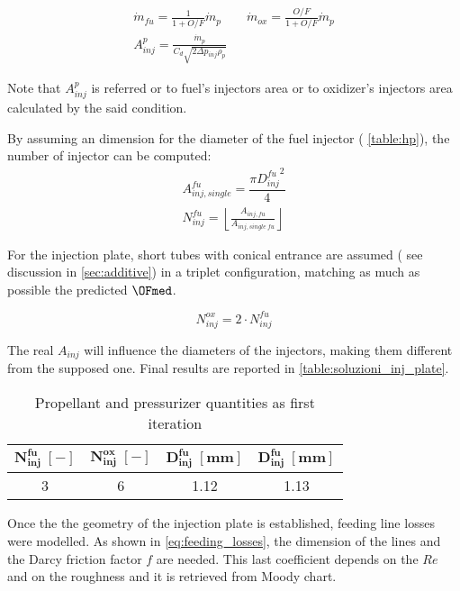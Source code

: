 \begin{gather}
    \dot{m}_{fu} = \frac{1}{1 + O/F}\dot{m}_p \qquad \dot{m}_{ox} = \frac{O/F}{1 + O/F}\dot{m}_p
    \\
    A_{inj}^p = \frac{\dot{m}_p}{C_d \sqrt{2\Delta p_{inj} \rho_p}} 
\end{gather}

Note that $ A_{inj}^p$ is referred or to fuel's injectors area or to oxidizer's injectors area calculated by the said condition.

By assuming an dimension for the diameter of the fuel injector ( \autoref{table:hp}), the number of injector can be computed: 
\vspace{-0.5cm}
\begin{gather}
    A_{inj, single}^{fu} = \dfrac{\pi {D_{inj}^{fu}}^2}{4}
    \label{eq:aree_inj}
    \\
    N_{inj}^{fu} = \left\lfloor \frac{A_{inj,fu}}{A_{inj,single\;fu}}\right\rfloor
    \label{eq:number_fu_inj}
\end{gather}

For the injection plate, short tubes with conical entrance are assumed ( see discussion in \autoref{sec:additive}) in a triplet configuration, matching as much as possible the predicted $\OFmed$.

\begin{equation}
    N_{inj}^{ox} = 2 \cdot N_{inj}^{fu}
    \label{eq:number_ox_inj}
\end{equation} 

The real $ A_{inj}$ will influence the diameters of the injectors, making them different from the supposed one. Final results are reported in \autoref{table:soluzioni_inj_plate}.

\begin{table}[H]
    \renewcommand{\arraystretch}{1.5}
    \centering
    \begin{tabular}{|c|c|c|c|}
        \hline
        $\boldsymbol{N_{inj}^{fu}\; [-]}$ & $\boldsymbol{N_{inj}^{ox}\; [-]}$ & $\boldsymbol{D_{inj}^{fu} \; [\textbf{mm}]}$ & $\boldsymbol{D_{inj}^{fu} \; [\textbf{mm}]}$ \\
        \hline
        \hline
        3 & 6 & 1.12 & 1.13 \\
        \hline
    \end{tabular}
    \caption{Propellant and pressurizer quantities as first iteration}
    \label{table:soluzioni_inj_plate}
\end{table}


Once the the geometry of the injection plate is established, feeding line losses were modelled. As shown in \autoref{eq:feeding_losses}, the dimension of the lines and the Darcy friction factor $f$ are needed. This last coefficient depends on the $Re$ and on the roughness and it is retrieved from Moody chart\cite{colebrook}. 

